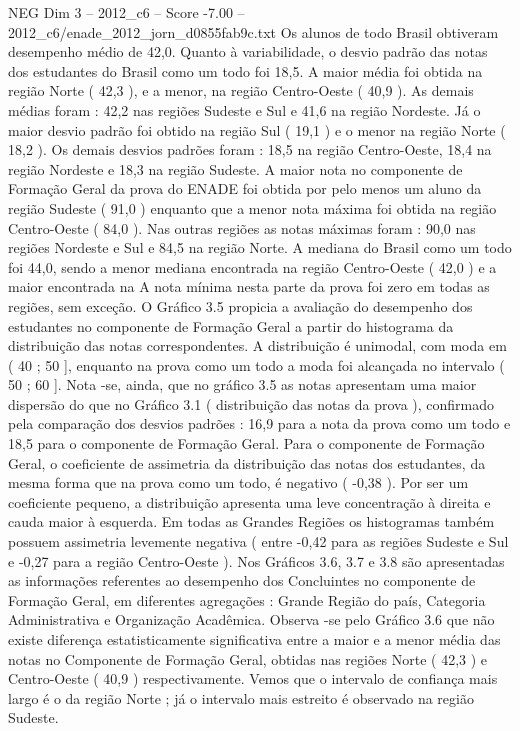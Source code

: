 \begin{textsample}{NEG Dim 3 – 2012\_c6 – Score -7.00 – 2012\_c6/enade\_2012\_jorn\_d0855fab9c.txt}
Os alunos de todo Brasil obtiveram desempenho médio de 42,0.
Quanto à variabilidade, o desvio padrão das notas dos estudantes do Brasil como um todo foi 18,5.
A maior média foi obtida na região Norte ( 42,3 ), e a menor, na região Centro-Oeste ( 40,9 ).
As demais médias foram : 42,2 nas regiões Sudeste e Sul e 41,6 na região Nordeste.
Já o maior desvio padrão foi obtido na região Sul ( 19,1 ) e o menor na região Norte ( 18,2 ).
Os demais desvios padrões foram : 18,5 na região Centro-Oeste, 18,4 na região Nordeste e 18,3 na região Sudeste.
A maior nota no componente de Formação Geral da prova do ENADE foi obtida por pelo menos um aluno da região Sudeste ( 91,0 ) enquanto que a menor nota máxima foi obtida na região Centro-Oeste ( 84,0 ).
Nas outras regiões as notas máximas foram : 90,0 nas regiões Nordeste e Sul e 84,5 na região Norte.
A mediana do Brasil como um todo foi 44,0, sendo a menor mediana encontrada na região Centro-Oeste ( 42,0 ) e a maior encontrada na A nota mínima nesta parte da prova foi zero em todas as regiões, sem exceção.
O Gráfico 3.5 propicia a avaliação do desempenho dos estudantes no componente de Formação Geral a partir do histograma da distribuição das notas correspondentes.
A distribuição é unimodal, com moda em ( 40 ; 50 ], enquanto na prova como um todo a moda foi alcançada no intervalo ( 50 ; 60 ].
Nota -se, ainda, que no gráfico 3.5 as notas apresentam uma maior dispersão do que no Gráfico 3.1 ( distribuição das notas da prova ), confirmado pela comparação dos desvios padrões : 16,9 para a nota da prova como um todo e 18,5 para o componente de Formação Geral.
Para o componente de Formação Geral, o coeficiente de assimetria da distribuição das notas dos estudantes, da mesma forma que na prova como um todo, é negativo ( -0,38 ).
Por ser um coeficiente pequeno, a distribuição apresenta uma leve concentração à direita e cauda maior à esquerda.
Em todas as Grandes Regiões os histogramas também possuem assimetria levemente negativa ( entre -0,42 para as regiões Sudeste e Sul e -0,27 para a região Centro-Oeste ).
Nos Gráficos 3.6, 3.7 e 3.8 são apresentadas as informações referentes ao desempenho dos Concluintes no componente de Formação Geral, em diferentes agregações : Grande Região do país, Categoria Administrativa e Organização Acadêmica.
Observa -se pelo Gráfico 3.6 que não existe diferença estatisticamente significativa entre a maior e a menor média das notas no Componente de Formação Geral, obtidas nas regiões Norte ( 42,3 ) e Centro-Oeste ( 40,9 ) respectivamente.
Vemos que o intervalo de confiança mais largo é o da região Norte ; já o intervalo mais estreito é observado na região Sudeste.

\end{textsample}

